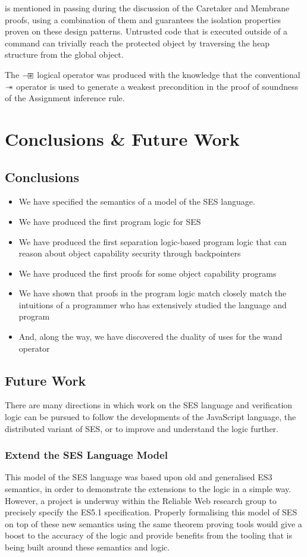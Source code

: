 \documentclass[a4paper,notitlepage]{report}
\begin{document}
 is mentioned in passing during the discussion of the Caretaker and
Membrane proofs, using a combination of them and  guarantees the
isolation properties proven on these design patterns. Untrusted code that is
executed outside of a  command can trivially reach the protected
object by traversing the heap structure from the global object.

The $\mathbin{-\mkern-3mu \boxast}$ logical operator was produced with the knowledge that the
conventional $\mathbin{-\mkern-6mu *}$ operator is used to generate a weakest precondition in the
proof of soundness of the Assignment inference rule.

\chapter{Conclusions \& Future Work}
\section{Conclusions}
\begin{itemize}
  \item We have specified the semantics of a model of the SES language.
  \item We have produced the first program logic for SES
  \item We have produced the first separation logic-based program logic that can
    reason about object capability security through backpointers
  \item We have produced the first proofs for some object capability programs
  \item We have shown that proofs in the program logic match closely match the
    intuitions of a programmer who has extensively studied the language and
    program
  \item And, along the way, we have discovered the duality of uses for the wand
    operator
\end{itemize}

\section{Future Work}
There are many directions in which work on the SES language and verification
logic can be pursued to follow the developments of the JavaScript language, the
distributed variant of SES, or to improve and understand the logic further.

\subsection{Extend the SES Language Model}
This model of the SES language was based upon old and generalised ES3 semantics,
in order to demonstrate the extensions to the logic in a simple way.
However, a project is underway within the Reliable Web research group to
precisely specify the ES5.1 specification.
Properly formalising this model of SES on top of these new semantics using the
same theorem proving tools would give a boost to the accuracy of the logic and
provide benefits from the tooling that is being built around these semantics and
logic.
\end{document}
